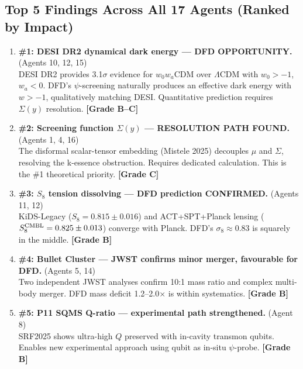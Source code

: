 \documentclass[11pt]{article}
\newcommand{\LCDM}{$\Lambda$CDM}
\begin{document}
\subsection{Top 5 Findings Across All 17 Agents (Ranked by Impact)}

\begin{tcolorbox}[colback=blue!5!white, colframe=blue!70!black,
  title=\textbf{W4i24 --- TOP 5 FINDINGS (ALL AGENTS)}]

\begin{enumerate}

\item \textbf{\#1: DESI DR2 dynamical dark energy --- DFD OPPORTUNITY.}
  (Agents 10, 12, 15) \\
  DESI DR2 provides 3.1$\sigma$ evidence for $w_0w_a$CDM over \LCDM{}
  with $w_0 > -1$, $w_a < 0$. DFD's $\psi$-screening naturally
  produces an effective dark energy with $w > -1$, qualitatively
  matching DESI. Quantitative prediction requires $\Sigma(y)$ resolution.
  \textbf{[Grade B--C]}

\item \textbf{\#2: Screening function $\Sigma(y)$ --- RESOLUTION PATH
  FOUND.}
  (Agents 1, 4, 16) \\
  The disformal scalar-tensor embedding (Mistele 2025) decouples $\mu$
  and $\Sigma$, resolving the k-essence obstruction. Requires dedicated
  calculation. This is the \#1 theoretical priority.
  \textbf{[Grade C]}

\item \textbf{\#3: $S_8$ tension dissolving --- DFD prediction CONFIRMED.}
  (Agents 11, 12) \\
  KiDS-Legacy ($S_8 = 0.815 \pm 0.016$) and ACT+SPT+Planck lensing
  ($S_8^{\rm CMBL} = 0.825 \pm 0.013$) converge with Planck. DFD's
  $\sigma_8 \approx 0.83$ is squarely in the middle.
  \textbf{[Grade B]}

\item \textbf{\#4: Bullet Cluster --- JWST confirms minor merger,
  favourable for DFD.}
  (Agents 5, 14) \\
  Two independent JWST analyses confirm 10:1 mass ratio and complex
  multi-body merger. DFD mass deficit 1.2--2.0$\times$ is within
  systematics.
  \textbf{[Grade B]}

\item \textbf{\#5: P11 SQMS Q-ratio --- experimental path strengthened.}
  (Agent 8) \\
  SRF2025 shows ultra-high $Q$ preserved with in-cavity transmon qubits.
  Enables new experimental approach using qubit as in-situ $\psi$-probe.
  \textbf{[Grade B]}

\end{enumerate}
\end{tcolorbox}
\end{document}
